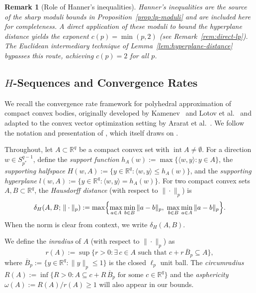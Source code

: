 \documentclass[11pt]{article}
\newtheorem{remark}{Remark}
\newcommand{\R}{\mathbb{R}}
\newcommand{\pstar}{p^*}
\begin{document}
\begin{remark}[Role of Hanner's inequalities]\label{rem:hanner-role}
Hanner's inequalities are the source of the sharp moduli bounds in Proposition~\ref{prop:lp-moduli} and are included here for completeness. A direct application of these moduli to bound the hyperplane distance yields the exponent $c(p) = \min(p,2)$ (see Remark~\ref{rem:direct-lp}). The Euclidean intermediary technique of Lemma~\ref{lem:hyperplane-distance} bypasses this route, achieving $c(p) = 2$ for all $p$.
\end{remark}

\subsection{$H$-Sequences and Convergence Rates}\label{sec:h-sequences}

We recall the convergence rate framework for polyhedral approximation of compact convex bodies, originally developed by Kamenev~\cite{Kamenev1992} and Lotov et al.~\cite{Lotov2004} and adapted to the convex vector optimization setting by Ararat et al.~\cite{Ararat2024}. We follow the notation and presentation of \cite[Section~6]{Ararat2024}, which itself draws on \cite[Chapter~8]{Lotov2004}.

Throughout, let $A \subset \R^q$ be a compact convex set with $\operatorname{int} A \neq \emptyset$. For a direction $w \in S_{\pstar}^{q-1}$, define the \emph{support function} $h_A(w) := \max\{\langle w, y \rangle : y \in A\}$, the \emph{supporting halfspace} $H(w, A) := \{y \in \R^q : \langle w, y \rangle \le h_A(w)\}$, and the \emph{supporting hyperplane} $l(w, A) := \{y \in \R^q : \langle w, y \rangle = h_A(w)\}$. For two compact convex sets $A, B \subset \R^q$, the \emph{Hausdorff distance} (with respect to $\|\cdot\|_p$) is
\[
\delta_H(A, B;\, \|\cdot\|_p) := \max\Bigl\{\max_{a \in A} \min_{b \in B} \|a - b\|_p,\; \max_{b \in B} \min_{a \in A} \|a - b\|_p\Bigr\}.
\]
When the norm is clear from context, we write $\delta_H(A, B)$.

We define the \emph{inradius} of $A$ (with respect to $\|\cdot\|_p$) as
\begin{equation}\label{eq:inradius}
r(A) := \sup\{r > 0 : \exists\, c \in A \text{ such that } c + r\,\overline{B}_p \subseteq A\},
\end{equation}
where $\overline{B}_p := \{y \in \R^q : \|y\|_p \le 1\}$ is the closed $\ell_p$ unit ball. The \emph{circumradius} $R(A) := \inf\{R > 0 : A \subseteq c + R\,\overline{B}_p \text{ for some } c \in \R^q\}$ and the \emph{asphericity} $\omega(A) := R(A)/r(A) \ge 1$ will also appear in our bounds.
\end{document}
